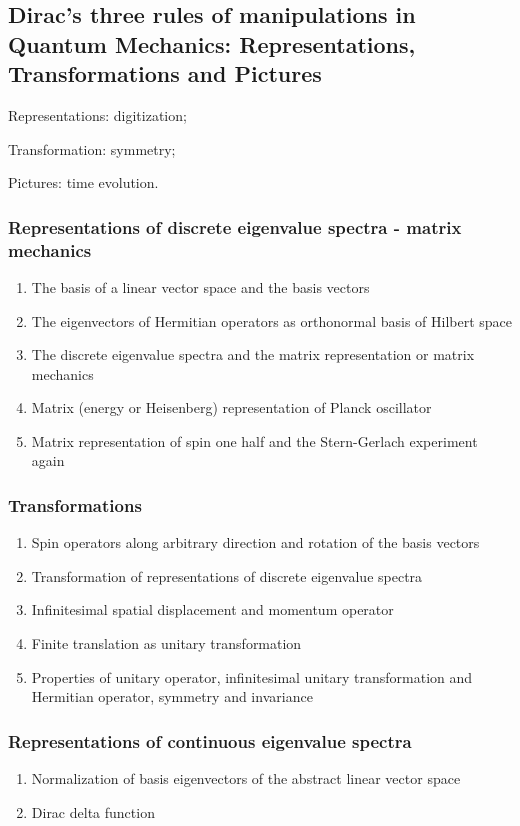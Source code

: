 \documentclass[12pt]{article}
\numberwithin{equation}{section}
\begin{document}
\subsection{Dirac's three rules of manipulations in Quantum Mechanics: 
                       Representations, Transformations and Pictures}
	Representations: digitization; \par
	Transformation: symmetry; \par   
	Pictures: time evolution.                               
\subsubsection{Representations of discrete eigenvalue spectra - matrix mechanics}
\begin{enumerate}
\item The basis of a linear vector space and the basis vectors
\item The eigenvectors of Hermitian operators as orthonormal basis of Hilbert space
\item The discrete eigenvalue spectra and the matrix representation or matrix mechanics
\item Matrix (energy or Heisenberg) representation of Planck oscillator
\item Matrix representation of spin one half and the Stern-Gerlach experiment again
\end{enumerate}
\subsubsection{Transformations}
\begin{enumerate}
\item Spin operators along arbitrary direction and rotation of the basis vectors
\item Transformation of representations of discrete eigenvalue spectra
\item Infinitesimal spatial displacement and momentum operator
\item Finite translation as unitary transformation
\item Properties of unitary operator, infinitesimal unitary transformation and Hermitian operator, symmetry and invariance
\end{enumerate}
\subsubsection{Representations of continuous eigenvalue spectra}
\begin{enumerate}
\item Normalization of basis eigenvectors of the abstract linear vector space
\item Dirac delta function
\end{enumerate}
\end{document}
